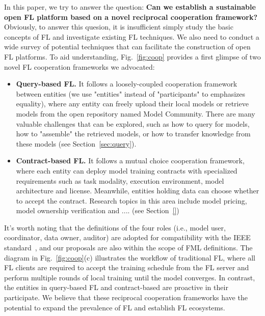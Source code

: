 In this paper, we try to answer the question: \textbf{Can we establish a sustainable open FL platform based on a novel reciprocal cooperation framework?}
Obviously, to answer this quesion, it is insufficient simply study the basic concepts of FL and investigate existing FL techniques.
We also need to conduct a wide survey of potential techniques that can facilitate the construction of open FL platforms.
To aid understanding, Fig.~\ref{fig:coop} provides a first glimpse of two novel FL cooperation frameworks we advocated: 
\begin{itemize}
    \item \textbf{Query-based FL.} It follows a loosely-coupled cooperation framework between entities (we use "entities" instead of "participants" to emphasizes equality), where any entity can freely upload their local models or retrieve models from the open repository named Model Community.
    There are many valuable challenges that can be explored, such as how to query for models, how to "assemble" the retrieved models, or how to transfer knowledge from these models (see Section~\ref{sec:query}). %
    \item \textbf{Contract-based FL.} It follows a mutual choice cooperation framework, where each entity can deploy model training contracts with specialized requirements such as task modality, execution environment, model architecture and license. Meanwhile, entities holding data can choose whether to accept the contract.
    Research topics in this area include model pricing, model ownership verification and .... (see Section~\ref{}) %
\end{itemize}
It's worth noting that the definitions of the four roles (i.e., model user, coordinator, data owner, auditor) are adopted for compatibility with the IEEE standard~\cite{IEEEstd3652}, and our proposals are also within the scope of FML definitions. 
The diagram in Fig.~\ref{fig:coop}(c) illustrates the workflow of traditional FL, where all FL clients are required to accept the training schedule from the FL server and perform multiple rounds of local training until the model converges.
In contrast, the entities in query-based FL and contract-based are proactive in their participate.
We believe that these reciprocal cooperation frameworks have the potential to expand the prevalence of FL and establish FL ecosystems.

